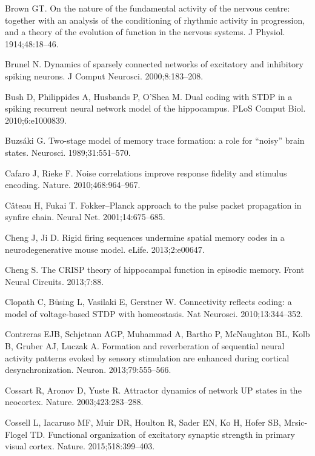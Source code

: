 \begin{thebibliography}{}
Brown GT.
\newblock On the nature of the fundamental activity of the nervous centre: together 
with an analysis of the conditioning of rhythmic activity in progression, and a 
theory of the evolution of function in the nervous systems.
\newblock J Physiol. 1914;48:18--46.

Brunel N.
\newblock Dynamics of sparsely connected networks of excitatory and inhibitory spiking neurons.
\newblock J Comput Neurosci. 2000;8:183--208.

Bush D, Philippides A, Husbands P, O'Shea M. 
\newblock Dual coding with STDP in a spiking recurrent neural network model of the hippocampus.
\newblock PLoS Comput Biol. 2010;6:e1000839.

Buzs\'{a}ki G.
\newblock Two-stage model of memory trace formation: a role for ``noisy'' brain
  states.
\newblock Neurosci. 1989;31:551--570.

Cafaro J, Rieke F.
\newblock Noise correlations improve response fidelity and stimulus encoding.
\newblock Nature. 2010;468:964--967.

C\^ateau H, Fukai T.
\newblock Fokker--Planck approach to the pulse packet propagation in synfire chain.
\newblock Neural Net. 2001;14:675--685.

Cheng J, Ji D.
\newblock Rigid firing sequences undermine spatial memory codes in a neurodegenerative mouse model.
\newblock eLife. 2013;2:e00647.

Cheng S.
\newblock The CRISP theory of hippocampal function in episodic memory.
\newblock Front Neural Circuits. 2013;7:88.

Clopath C, B{\"u}sing L, Vasilaki E, Gerstner W.
\newblock Connectivity reflects coding: a model of voltage-based STDP with
  homeostasis.
\newblock Nat Neurosci. 2010;13:344--352.

Contreras EJB, Schjetnan AGP, Muhammad A, Bartho P, McNaughton BL, Kolb B, Gruber AJ, Luczak A.
\newblock Formation and reverberation of sequential neural activity patterns evoked by sensory stimulation are enhanced during cortical desynchronization.
\newblock Neuron. 2013;79:555--566.

Cossart R, Aronov D, Yuste R.
\newblock Attractor dynamics of network UP states in the neocortex.
\newblock Nature. 2003;423:283--288.

Cossell L, Iacaruso MF, Muir DR, Houlton R, Sader EN, Ko H, Hofer SB,  Mrsic-Flogel TD.
\newblock Functional organization of excitatory synaptic strength in primary visual cortex.
\newblock Nature. 2015;518:399--403.


\end{thebibliography}
